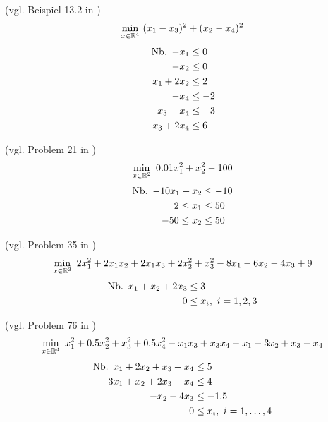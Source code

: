 \begin{testproblem}
(vgl. Beispiel 13.2 in \cite[S.~415f]{antoniou})
\begin{equation}
\min_{x\in\mathbb{R}^4}\ (x_1 - x_3)^2 + (x_2 - x_4)^2
\end{equation}
\begin{equation*}
\begin{split}
\nb -x_1 & \leq 0 \\
-x_2 & \leq 0 \\
x_1 + 2 x_2 & \leq 2 \\
-x_4 & \leq -2 \\
-x_3 - x_4 & \leq -3 \\
x_3 + 2 x_4 & \leq 6 \\
\end{split}
\end{equation*}
\end{testproblem}

\begin{testproblem}
(vgl. Problem 21 in \cite[S.~44]{hock})
\begin{equation}
\min_{x\in\mathbb{R}^2}\ 0.01 x_1^2 + x_2^2 - 100
\end{equation}
\begin{equation*}
\begin{split}
\nb -10 x_1 + x_2 & \leq -10 \\
2 \leq x_1 & \leq 50 \\
-50 \leq x_2 & \leq 50 \\
\end{split}
\end{equation*}
\end{testproblem}

\begin{testproblem}
(vgl. Problem 35 in \cite[S.~58]{hock})
\begin{equation}
\min_{x\in\mathbb{R}^3}\ 2 x_1^2 + 2 x_1 x_2 + 2 x_1 x_3 + 2 x_2^2 + x_3^2 - 8 x_1 - 6 x_2 - 4 x_3 + 9
\end{equation}
\begin{equation*}
\begin{split}
\nb x_1 + x_2 + 2 x_3 & \leq 3 \\
0 & \leq x_i,\ i = 1,2,3 \\
\end{split}
\end{equation*}
\end{testproblem}

\begin{testproblem}
(vgl. Problem 76 in \cite[S.~96]{hock})
\begin{equation}
\min_{x\in\mathbb{R}^4}\ x_1^2 + 0.5 x_2^2 + x_3^2 + 0.5 x_4^2 - x_1 x_3 + x_3 x_4 - x_1 - 3 x_2 + x_3 - x_4
\end{equation}
\begin{equation*}
\begin{split}
\nb x_1 + 2 x_2 + x_3 + x_4 & \leq 5 \\
3 x_1 + x_2 + 2 x_3 - x_4 & \leq 4 \\
-x_2 - 4 x_3 & \leq -1.5 \\
0 & \leq x_i,\ i = 1,\ldots,4 \\
\end{split}
\end{equation*}
\end{testproblem}
